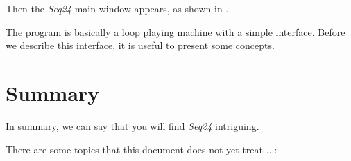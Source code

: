 \documentclass[
 11pt,
 twoside,
 a4paper,
 headinclude,
 footinclude,
 final                                 %
]{article}
\begin{document}
   
   Then the \textsl{Seq24} main window appears, as shown in
   .

   The program is basically a loop playing machine with a 
   simple interface.  Before we describe this interface, it is useful to
   present some concepts.

















% 


% 

\section{Summary}
\label{sec:summary}

   In summary, we can say that you will find \textsl{Seq24} intriguing.

   There are some topics that this document does not yet treat ...:




\printindex
\end{document}
